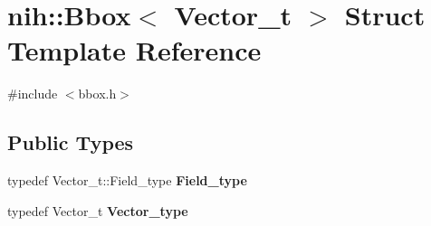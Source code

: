 \hypertarget{structnih_1_1_bbox}{
\section{nih\-:\-:\-Bbox$<$ \-Vector\-\_\-t $>$ \-Struct \-Template \-Reference}
\label{structnih_1_1_bbox}
}


{\ttfamily \#include $<$bbox.\-h$>$}

\subsection*{\-Public \-Types}
\begin{DoxyCompactItemize}
\item 
\hypertarget{structnih_1_1_bbox_a113f19f55207310819ac31e884a70f90}{
typedef \-Vector\-\_\-t\-::\-Field\-\_\-type {\bfseries \-Field\-\_\-type}}
\label{structnih_1_1_bbox_a113f19f55207310819ac31e884a70f90}

\item 
\hypertarget{structnih_1_1_bbox_acf704ab7932cbe6c2ca02653ba5c9e18}{
typedef \-Vector\-\_\-t {\bfseries \-Vector\-\_\-type}}
\label{structnih_1_1_bbox_acf704ab7932cbe6c2ca02653ba5c9e18}

\end{DoxyCompactItemize}
